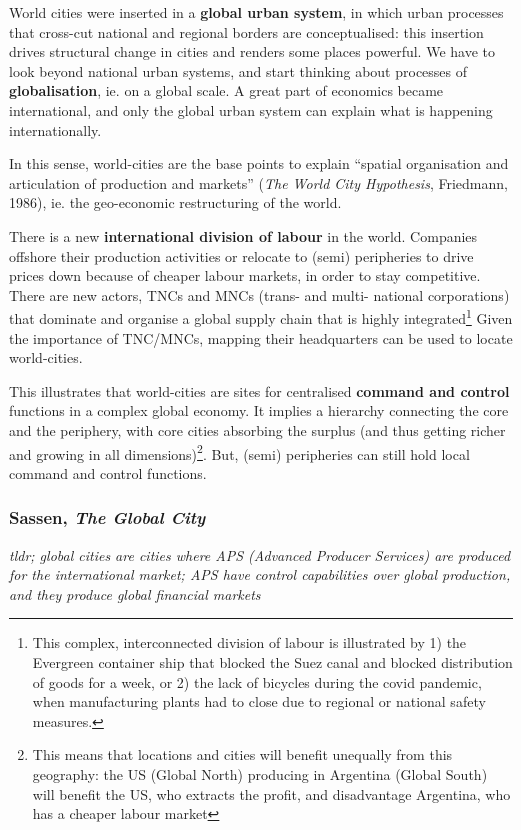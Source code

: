 \documentclass{article}
\begin{document}
World cities were inserted in a \textbf{global urban system}, in which urban processes that cross-cut national and regional borders are conceptualised: this insertion drives structural change in cities and renders some places powerful. We have to look beyond national urban systems, and start thinking about processes of \textbf{globalisation}, ie. on a global scale. A great part of economics became international, and only the global urban system can explain what is happening internationally. 

In this sense, world-cities are the base points to explain ``spatial organisation and articulation of production and markets'' (\textit{The World City Hypothesis}, Friedmann, 1986), ie. the geo-economic restructuring of the world.

There is a new \textbf{international division of labour} in the world. Companies offshore their production activities or relocate to (semi) peripheries to drive prices down because of cheaper labour markets, in order to stay competitive. There are new actors, TNCs and MNCs (trans- and multi- national corporations) that dominate and organise a global supply chain that is highly integrated\footnote{This complex, interconnected division of labour is illustrated by 1) the Evergreen container ship that blocked the Suez canal and blocked distribution of goods for a week, or 2) the lack of bicycles during the covid pandemic, when manufacturing plants had to close due to regional or national safety measures.} Given the importance of TNC/MNCs, mapping their headquarters can be used to locate world-cities. 

This illustrates that world-cities are sites for centralised \textbf{command and control} functions in a complex global economy. It implies a hierarchy connecting the core and the periphery, with core cities absorbing the surplus (and thus getting richer and growing in all dimensions)\footnote{This means that locations and cities will benefit unequally from this geography: the US (Global  North) producing in Argentina (Global South) will benefit the US, who extracts the profit, and disadvantage Argentina, who has a cheaper labour market}. But, (semi) peripheries can still hold local command and control functions.

\subsubsection{Sassen, \textit{The Global City}}

\textit{tldr; global cities are cities where APS (Advanced Producer Services) are produced for the international market; APS have control capabilities over global production, and they produce global financial markets}
\end{document}
